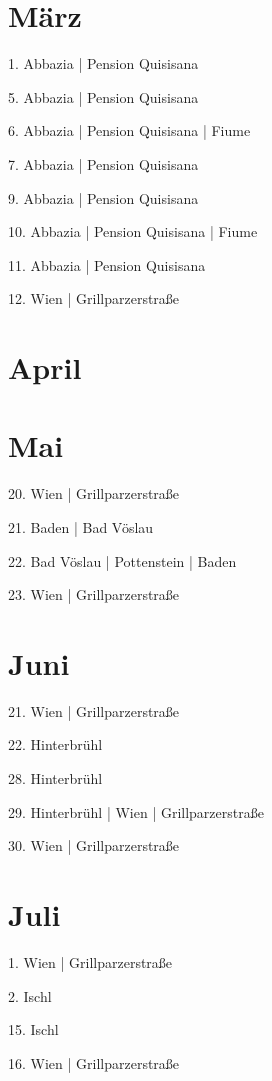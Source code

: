 \documentclass[twoside=false,titlepage=false,open=any, parskip=never, fontsize=10pt, headings=small, chapterprefix=false, appendixprefix=false, DIV=15]{scrbook}
\begin{document}
\begin{multicols}{3}
            \section*{März}
            1. Abbazia | Pension Quisisana\par
            5. Abbazia | Pension Quisisana\par
            6. Abbazia | Pension Quisisana | Fiume\par
            7. Abbazia | Pension Quisisana\par
            9. Abbazia | Pension Quisisana\par
            10. Abbazia | Pension Quisisana | Fiume\par
            11. Abbazia | Pension Quisisana\par
            12. Wien | Grillparzerstraße\par
            \section*{April}
            \section*{Mai}
            20. Wien | Grillparzerstraße\par
            21. Baden | Bad Vöslau\par
            22. Bad Vöslau | Pottenstein | Baden\par
            23. Wien | Grillparzerstraße\par
            \section*{Juni}
            21. Wien | Grillparzerstraße\par
            22. Hinterbrühl\par
            28. Hinterbrühl\par
            29. Hinterbrühl | Wien | Grillparzerstraße\par
            30. Wien | Grillparzerstraße\par
            \section*{Juli}
            1. Wien | Grillparzerstraße\par
            2. Ischl\par
            15. Ischl\par
            16. Wien | Grillparzerstraße\par

\end{multicols}
\end{document}
